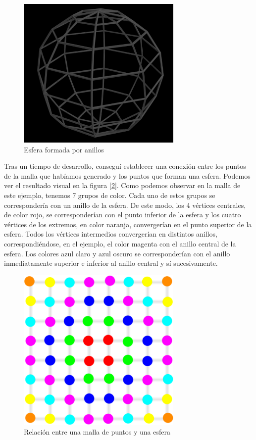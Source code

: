 \begin{figure}[h]
	\centering
	\includegraphics[width=8cm]{archivos/sphere}
	\caption{Esfera formada por anillos}
	\label{fig:sphere}
\end{figure}

Tras un tiempo de desarrollo, conseguí establecer una conexión entre los puntos de la malla que habíamos generado y los puntos que forman una esfera. Podemos ver el resultado visual en la figura [\ref{fig:planeToSphere}]. Como podemos observar en la malla de este ejemplo, tenemos 7 grupos de color. Cada uno de estos grupos se correspondería con un anillo de la esfera. De este modo, los 4 vértices centrales, de color rojo, se corresponderían con el punto inferior de la esfera y los cuatro vértices de los extremos, en color naranja, convergerían en el punto superior de la esfera. Todos los vértices intermedios convergerían en distintos anillos, correspondiéndose, en el ejemplo, el color magenta con el anillo central de la esfera. Los colores azul claro y azul oscuro se corresponderían con el anillo inmediatamente superior e inferior al anillo central y sí sucesivamente.\\

\begin{figure}[h]
	\centering
	\includegraphics[width=8cm]{archivos/planeToSphere}
	\caption{Relación entre una malla de puntos y una esfera}
	\label{fig:planeToSphere}
\end{figure}

